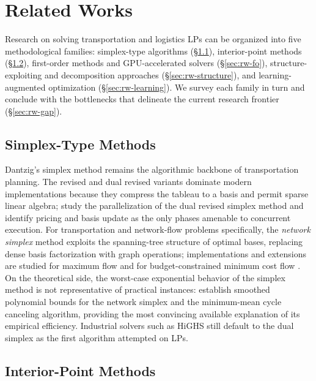 \section{Related Works}
\label{sec:related-works}

Research on solving transportation and logistics LPs can be organized into five methodological families: simplex-type algorithms (\S\ref{sec:rw-simplex}), interior-point methods (\S\ref{sec:rw-ipm}), first-order methods and GPU-accelerated solvers (\S\ref{sec:rw-fo}), structure-exploiting and decomposition approaches (\S\ref{sec:rw-structure}), and learning-augmented optimization (\S\ref{sec:rw-learning}). We survey each family in turn and conclude with the bottlenecks that delineate the current research frontier (\S\ref{sec:rw-gap}).

\subsection{Simplex-Type Methods}
\label{sec:rw-simplex}

Dantzig's simplex method \citep{dantzig1951application} remains the algorithmic backbone of transportation planning. The revised and dual revised variants dominate modern implementations because they compress the tableau to a basis and permit sparse linear algebra; \citet{huangfu2015parallel} study the parallelization of the dual revised simplex method and identify pricing and basis update as the only phases amenable to concurrent execution. For transportation and network-flow problems specifically, the \emph{network simplex} method exploits the spanning-tree structure of optimal bases, replacing dense basis factorization with graph operations; implementations and extensions are studied for maximum flow \citep{watanabe2017network} and for budget-constrained minimum cost flow \citep{holzhauser2016network}. On the theoretical side, the worst-case exponential behavior of the simplex method is not representative of practical instances: \citet{cornelissen2015smoothed} establish smoothed polynomial bounds for the network simplex and the minimum-mean cycle canceling algorithm, providing the most convincing available explanation of its empirical efficiency. Industrial solvers such as HiGHS \citep{huangfu2018highs} still default to the dual simplex as the first algorithm attempted on LPs.

\subsection{Interior-Point Methods}
\label{sec:rw-ipm}

